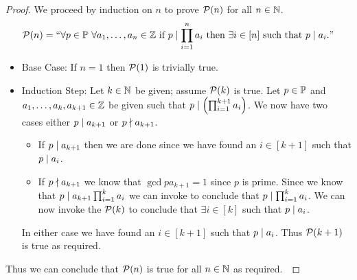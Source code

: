         \begin{proof}
            We proceed by induction on $n$ to prove $\mathcal{P}(n)$ for all $n \in \mathbb{N}$.
            \[
                \inductive{P}{n} = ``\forall p \in \set{P} \ \forall a_1, \dots, a_n \in \set{Z}
                                    \mbox{ if } \divides{p}{\prod_{i = 1}^{n} a_i} \mbox{ then } 
                                    \exists i \in [n] \mbox{ such that } \divides{p}{a_i}."
            \]
            \begin{itemize}
                \item
                    Base Case: If $n = 1$ then $\mathcal{P}(1)$ is trivially true.
                \item
                    Induction Step: Let $k \in \mathbb{N}$ be given; assume $\mathcal{P}(k)$ is
                    true. Let $p \in \mathbb{P}$ and $a_1, \dots, a_k, a_{k + 1} \in \mathbb{Z}$ be
                    given such that $p \mid \left(\prod_{i = 1}^{k + 1} a_i\right)$.
                    We now have two cases either $p \mid a_{k + 1}$ or $p \nmid a_{k + 1}$.
                    \begin{itemize}
                        \item
                            If $p \mid a_{k + 1}$ then we are done since we have found an
                            $i \in [k + 1]$ such that $p \mid a_i$.
                        \item
                            If $p \nmid a_{k + 1}$ we know that $\gcd{p}{a_{k + 1}} = 1$
                            since $p$ is prime. Since we know that $p \mid a_{k + 1} \prod_{i = 1}^{k} a_i$
                            we can invoke  to conclude that $p \mid \prod_{i = 1}^k a_i$.
                            We can now invoke the $\mathcal{P}(k)$ to conclude that $\exists i \in [k]$
                            such that $p \mid a_i$.
                    \end{itemize}
                    In either case we have found an $i \in [k + 1]$ such that $p \mid a_i$.
                    Thus $\mathcal{P}(k + 1)$ is true as required.
            \end{itemize}
            Thus we can conclude that $\mathcal{P}(n)$ is true for all $n \in \mathbb{N}$
            as required.~\QED
        \end{proof}
